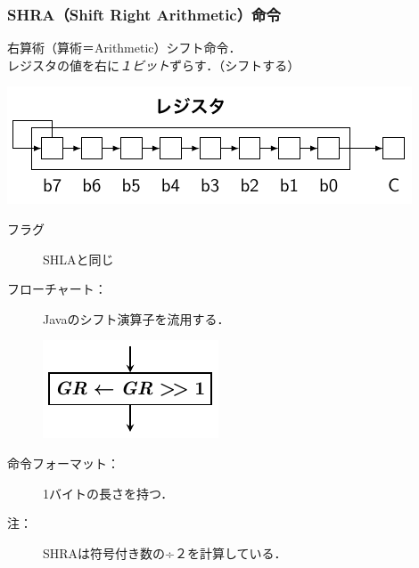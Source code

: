\documentclass{beamer}                 %
\begin{document}
\begin{frame}
  \frametitle{SHRA（Shift Right Arithmetic）命令}
  右算術（算術＝Arithmetic）シフト命令．\\
  レジスタの値を右に\emph{１ビット}ずらす．（シフトする）
  \vfill
  \centerline{\includegraphics[scale=0.7]{../Tikz/shft2.pdf}}
  \vfill
  \begin{description}
  \item[フラグ] SHLAと同じ
    \vfill
  \item[フローチャート：] Javaのシフト演算子を流用する．\\
    \centerline{\includegraphics[scale=0.7]{../Tikz/shra.pdf}}
    \vfill
  \item[命令フォーマット：] 1バイトの長さを持つ．\\
  \item[注：] SHRAは符号付き数の÷２を計算している．\\
  \end{description}
  \vfill
\end{frame}
\end{document}
